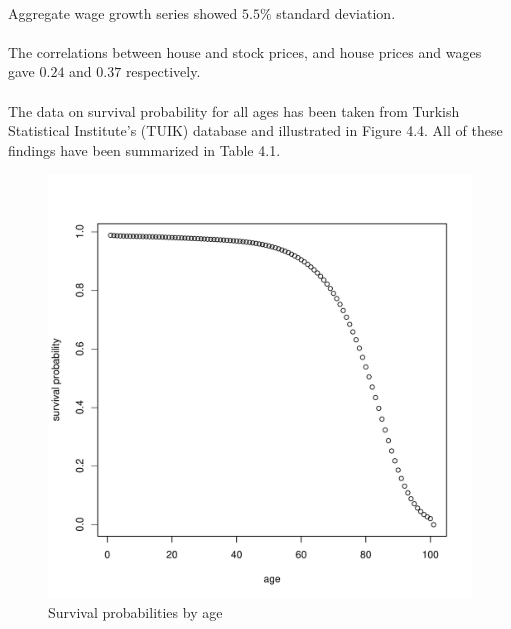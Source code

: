 \documentclass[]{elsarticle}
\begin{document}
\paragraph{}Aggregate wage growth series showed $5.5\%$ standard deviation.

\paragraph{}The correlations between house and stock prices, and house prices and wages gave $0.24$ and $0.37$ respectively.

\paragraph{}The data on survival probability for all ages has been taken from Turkish Statistical Institute's (TUIK) database and illustrated in Figure 4.4. All of these findings have been summarized in Table 4.1. 

\begin{figure}[h]
	\centering
	\includegraphics[scale=0.6]{figs/survival.pdf}
	\caption{Survival probabilities by age}
\end{figure}
\end{document}
